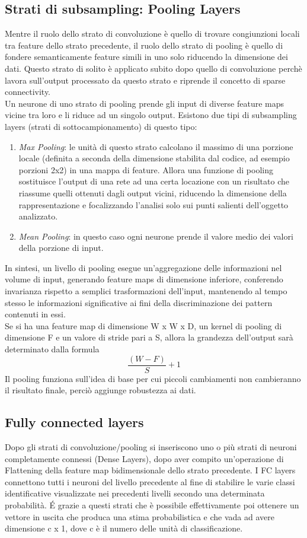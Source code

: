 \subsection{Strati di subsampling: Pooling Layers}
Mentre il ruolo dello strato di convoluzione è quello di trovare congiunzioni locali tra feature
dello strato precedente, il ruolo dello strato di pooling è quello di fondere
 semanticamente feature simili in uno solo riducendo la dimensione dei dati.
Questo strato di solito è applicato subito dopo quello di convoluzione perchè lavora sull’output
 processato da questo strato e riprende il concetto di sparse connectivity.\\
  Un neurone di uno strato di pooling prende gli input di diverse feature maps
   vicine tra loro e li riduce ad un singolo output. 
Esistono due tipi di subsampling layers (strati di sottocampionamento) di questo tipo:\\
\begin{enumerate}
     \item \emph{Max Pooling}: le unità di questo strato calcolano il massimo di una porzione locale (definita a seconda della dimensione stabilita dal codice, ad esempio porzioni 2x2) in una mappa di feature. Allora una funzione di pooling sostituisce l’output di una rete ad una certa locazione con un risultato che riassume quelli ottenuti dagli output vicini, riducendo la dimensione della rappresentazione e focalizzando l’analisi solo sui punti salienti dell’oggetto analizzato. 
\item \emph{Mean Pooling}: in questo caso ogni neurone prende il valore medio dei valori 
della porzione di input. 
\end{enumerate}
In sintesi, un livello di pooling esegue un’aggregazione delle informazioni nel volume di input, 
generando feature maps di dimensione inferiore, conferendo invarianza rispetto 
a semplici trasformazioni dell’input, mantenendo al tempo stesso
le informazioni significative ai fini della discriminazione dei pattern contenuti in essi.\\
Se si ha una feature map di dimensione W x W x D, un kernel di pooling di dimensione F 
e un valore di stride pari a S, allora la grandezza dell’output sarà determinato dalla formula 
\[\frac{(W - F)}{S}+1\]
Il pooling funziona sull’idea di base per cui piccoli cambiamenti non cambieranno 
il risultato finale, perciò aggiunge robustezza ai dati. 
\subsection{Fully connected layers}
Dopo gli strati di convoluzione/pooling si inseriscono uno o più strati di neuroni completamente connessi (Dense Layers), 
dopo aver compito un'operazione di Flattening della feature map bidimensionale dello strato precedente.
I FC layers connettono tutti i neuroni del livello precedente al fine di stabilire 
le varie classi identificative visualizzate nei precedenti livelli secondo una determinata probabilità.
É grazie a questi strati che è possibile effettivamente poi ottenere un vettore in uscita
 che produca una stima probabilistica e che vada 
ad avere dimensione c x 1, dove c è il numero delle unità di classificazione. 

